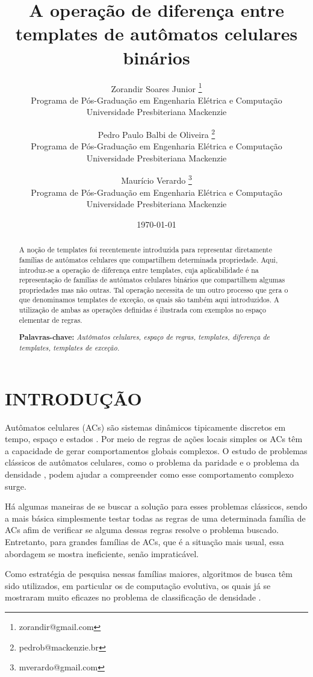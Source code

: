 \documentclass[12pt, a4paper]{article}
\title{A operação de diferença entre templates de autômatos celulares binários}
\author{Zorandir Soares Junior \footnote{zorandir@gmail.com} \\
 	Programa de Pós-Graduação em Engenharia Elétrica e Computação \\
	Universidade Presbiteriana Mackenzie
	\and
	Pedro Paulo Balbi de Oliveira \footnote{pedrob@mackenzie.br}  \\
 	Programa de Pós-Graduação em Engenharia Elétrica e Computação \\
	Universidade Presbiteriana Mackenzie
	\and
	Maurício Verardo \footnote{mverardo@gmail.com}  \\
 	Programa de Pós-Graduação em Engenharia Elétrica e Computação \\
	Universidade Presbiteriana Mackenzie
	}
\date{\today}
\begin{document}

\pagestyle{plain}
\renewcommand{\baselinestretch}{1.25} 
\normalsize

\maketitle

\begin{abstract}
 A noção de templates foi recentemente introduzida para representar diretamente famílias de autômatos celulares que compartilhem determinada propriedade. Aqui, introduz-se a operação de diferença entre templates, cuja aplicabilidade é na representação de famílias de autômatos celulares binários que compartilhem algumas propriedades mas não outras. Tal operação necessita de um outro processo que gera o que denominamos templates de exceção, os quais são também aqui introduzidos. A utilização de ambas as operações definidas é ilustrada com exemplos no espaço elementar de regras.

\begin{flushleft}
{\bf Palavras-chave:} {\it Autômatos celulares, espaço de regras, templates, diferença de templates, templates de exceção.}
\end{flushleft}
\end{abstract}

\section{INTRODUÇÃO}
\label{sec:introducao}
Autômatos celulares (ACs) são sistemas dinâmicos tipicamente discretos em tempo, espaço e estados \cite{wolfram2002}. Por meio de regras de ações locais simples os ACs têm a capacidade de gerar comportamentos globais complexos. O estudo de problemas clássicos de autômatos celulares, como o problema da paridade \cite{Betel2013} e o problema da densidade \cite{deOliveira2014density}, podem ajudar a compreender como esse comportamento complexo surge.

Há algumas maneiras de se buscar a solução para esses problemas clássicos, sendo a mais básica simplesmente testar todas as regras de uma determinada família de ACs afim de verificar se alguma dessas regras resolve o problema buscado. Entretanto, para grandes famílias de ACs, que é a situação mais usual, essa abordagem se mostra ineficiente, senão impraticável.

Como estratégia de pesquisa nessas famílias maiores, algoritmos de busca têm sido utilizados, em particular os de computação evolutiva, os quais já se mostraram muito eficazes no problema de classificação de densidade \cite{wolz2008very}.
\end{document}
